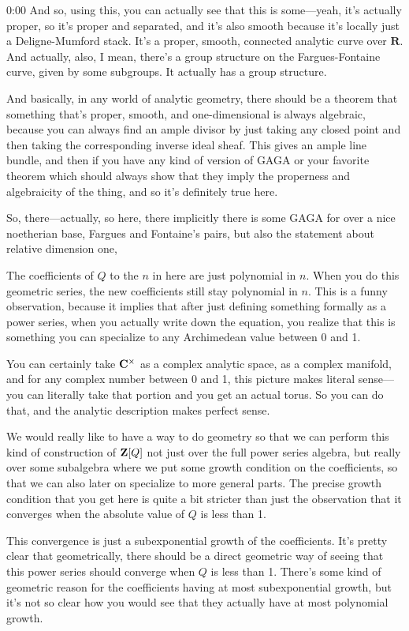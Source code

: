 \begin{unfinished}{0:00}
And so, using this, you can actually see that this is some---yeah, it's actually proper, so it's proper and separated, and it's also smooth because it's locally just a Deligne-Mumford stack. It's a proper, smooth, connected analytic curve over $\mathbf{R}$. And actually, also, I mean, there's a group structure on the Fargues-Fontaine curve, given by some subgroups. It actually has a group structure.

And basically, in any world of analytic geometry, there should be a theorem that something that's proper, smooth, and one-dimensional is always algebraic, because you can always find an ample divisor by just taking any closed point and then taking the corresponding inverse ideal sheaf. This gives an ample line bundle, and then if you have any kind of version of GAGA or your favorite theorem which should always show that they imply the properness and algebraicity of the thing, and so it's definitely true here.

So, there---actually, so here, there implicitly there is some GAGA for over a nice noetherian base, Fargues and Fontaine's pairs, but also the statement about relative dimension one,

The coefficients of $Q$ to the $n$ in here are just polynomial in $n$. When you do this geometric series, the new coefficients still stay polynomial in $n$. This is a funny observation, because it implies that after just defining something formally as a power series, when you actually write down the equation, you realize that this is something you can specialize to any Archimedean value between 0 and 1.

You can certainly take $\mathbf C^\times$ as a complex analytic space, as a complex manifold, and for any complex number between 0 and 1, this picture makes literal sense---you can literally take that portion and you get an actual torus. So you can do that, and the analytic description makes perfect sense.

We would really like to have a way to do geometry so that we can perform this kind of construction of $\mathbf Z[Q]$ not just over the full power series algebra, but really over some subalgebra where we put some growth condition on the coefficients, so that we can also later on specialize to more general parts. The precise growth condition that you get here is quite a bit stricter than just the observation that it converges when the absolute value of $Q$ is less than 1.

This convergence is just a subexponential growth of the coefficients. It's pretty clear that geometrically, there should be a direct geometric way of seeing that this power series should converge when $Q$ is less than 1. There's some kind of geometric reason for the coefficients having at most subexponential growth, but it's not so clear how you would see that they actually have at most polynomial growth.


\end{unfinished}
